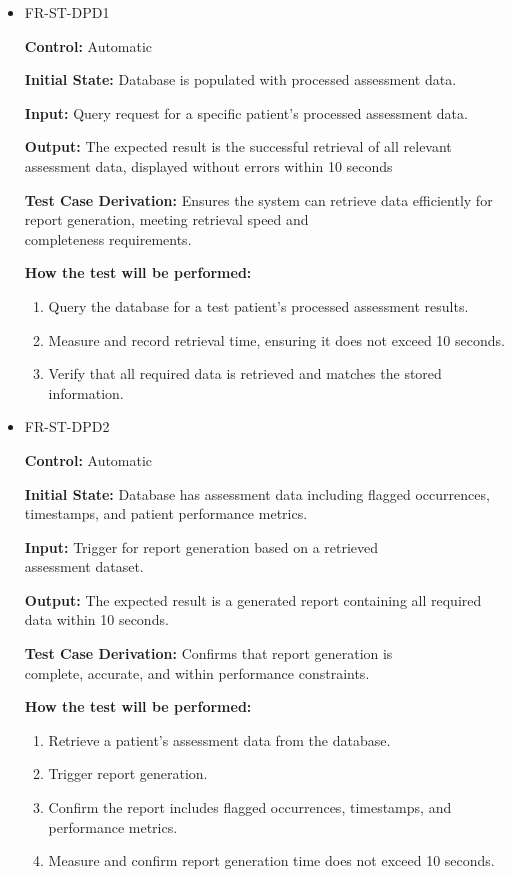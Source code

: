 \documentclass[12pt, titlepage]{article}
\begin{document}
\begin{itemize}
  \item FR-ST-DPD1
  \begin{mdframed}[linewidth=0.5mm]
      \textbf{Control:} Automatic \par
      \textbf{Initial State:} Database is populated with processed assessment data. \par
      \textbf{Input:} Query request for a specific patient’s processed assessment data. \par
      \textbf{Output:} The expected result is the successful retrieval of all relevant assessment data, displayed without errors within 10 seconds \par
      \textbf{Test Case Derivation:} Ensures the system can retrieve data efficiently for report generation, meeting retrieval speed and \\completeness requirements. \par
      \textbf{How the test will be performed:}
      \begin{enumerate}[noitemsep]
        \item Query the database for a test patient’s processed assessment results. 
        \item Measure and record retrieval time, ensuring it does not exceed 10 seconds. 
        \item Verify that all required data is retrieved and matches the stored information.
      \end{enumerate}
  \end{mdframed}

  \item FR-ST-DPD2
  \begin{mdframed}[linewidth=0.5mm]
      \textbf{Control:} Automatic \par
      \textbf{Initial State:} Database has assessment data including flagged occurrences, timestamps, and patient performance metrics. \par
      \textbf{Input:} Trigger for report generation based on a retrieved \\assessment dataset. \par
      \textbf{Output:} The expected result is a generated report containing all required data within 10 seconds. \par
      \textbf{Test Case Derivation:} Confirms that report generation is \\complete, accurate, and within performance constraints. \par
      \textbf{How the test will be performed:}
      \begin{enumerate}[noitemsep]
        \item Retrieve a patient’s assessment data from the database. 
        \item Trigger report generation. 
        \item Confirm the report includes flagged occurrences, timestamps, and performance metrics. 
        \item Measure and confirm report generation time does not exceed 10 seconds.
      \end{enumerate}
  \end{mdframed}


\end{itemize}
\end{document}
